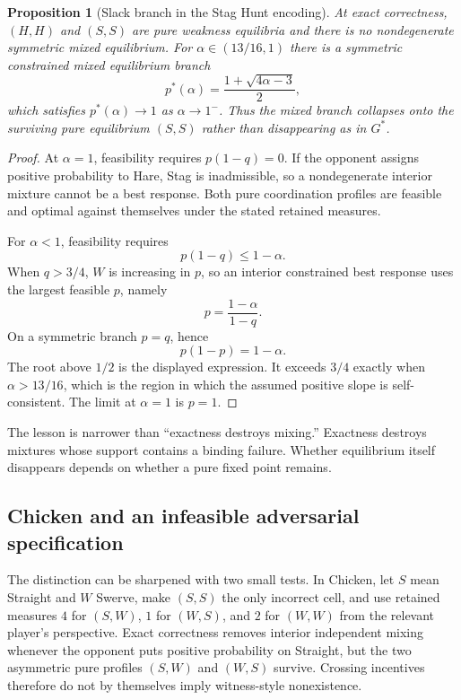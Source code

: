 \documentclass[11pt]{article}
\newtheorem{proposition}[theorem]{Proposition}
\theoremstyle{definition}
\begin{document}
\begin{proposition}[Slack branch in the Stag Hunt encoding]\label{prop:stag}
At exact correctness, $(H,H)$ and $(S,S)$ are pure weakness equilibria and there is no nondegenerate symmetric mixed equilibrium. For $\alpha\in(13/16,1)$ there is a symmetric constrained mixed equilibrium branch
\[
p^*(\alpha)=\frac{1+\sqrt{4\alpha-3}}{2},
\]
which satisfies $p^*(\alpha)\to1$ as $\alpha\to1^-$. Thus the mixed branch collapses onto the surviving pure equilibrium $(S,S)$ rather than disappearing as in $G^*$.
\end{proposition}

\begin{proof}
At $\alpha=1$, feasibility requires $p(1-q)=0$. If the opponent assigns positive probability to Hare, Stag is inadmissible, so a nondegenerate interior mixture cannot be a best response. Both pure coordination profiles are feasible and optimal against themselves under the stated retained measures.

For $\alpha<1$, feasibility requires
\[
p(1-q)\le1-\alpha.
\]
When $q>3/4$, $W$ is increasing in $p$, so an interior constrained best response uses the largest feasible $p$, namely
\[
p=\frac{1-\alpha}{1-q}.
\]
On a symmetric branch $p=q$, hence
\[
p(1-p)=1-\alpha.
\]
The root above $1/2$ is the displayed expression. It exceeds $3/4$ exactly when $\alpha>13/16$, which is the region in which the assumed positive slope is self-consistent. The limit at $\alpha=1$ is $p=1$.
\end{proof}

The lesson is narrower than ``exactness destroys mixing.'' Exactness destroys mixtures whose support contains a binding failure. Whether equilibrium itself disappears depends on whether a pure fixed point remains.

\subsection{Chicken and an infeasible adversarial specification}
The distinction can be sharpened with two small tests. In Chicken, let $S$ mean Straight and $W$ Swerve, make $(S,S)$ the only incorrect cell, and use retained measures $4$ for $(S,W)$, $1$ for $(W,S)$, and $2$ for $(W,W)$ from the relevant player's perspective. Exact correctness removes interior independent mixing whenever the opponent puts positive probability on Straight, but the two asymmetric pure profiles $(S,W)$ and $(W,S)$ survive. Crossing incentives therefore do not by themselves imply witness-style nonexistence.
\end{document}
